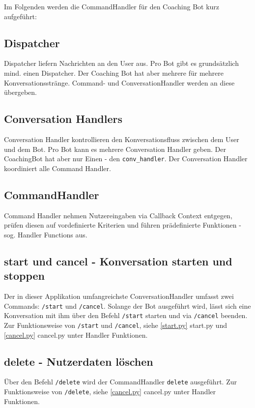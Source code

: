         Im Folgenden werden die CommandHandler für den Coaching Bot kurz aufgeführt:
        
        \subsection{Dispatcher}
            Dispatcher liefern Nachrichten an den User aus. Pro Bot gibt es grundsätzlich mind. einen Dispatcher. Der Coaching Bot hat aber mehrere für mehrere Konversationsstränge. Command- und ConversationHandler werden an diese übergeben.


        \subsection{Conversation Handlers}
            Conversation Handler kontrollieren den Konversationsfluss zwischen dem User und dem Bot. Pro Bot kann es mehrere Conversation Handler geben. Der CoachingBot hat aber nur Einen - den \verb|conv_handler|. Der Conversation Handler koordiniert alle Command Handler.


        \subsection{CommandHandler}
            Command Handler nehmen Nutzereingaben via Callback Context entgegen, prüfen diesen auf vordefinierte Kriterien und führen prädefinierte Funktionen - sog. Handler Functions aus.


        \subsection{start und cancel - Konversation starten und stoppen}
            Der in dieser Applikation umfangreichste ConversationHandler umfasst zwei Commands: \verb|/start| und \verb|/cancel|. Solange der Bot ausgeführt wird, lässt sich eine Konversation mit ihm über den Befehl \verb|/start| starten und via \verb|/cancel| beenden. Zur Funktionsweise von \verb|/start| und \verb|/cancel|, siehe \ref{start.py} start.py und \ref{cancel.py} cancel.py unter Handler Funktionen. 


        \subsection{delete - Nutzerdaten löschen}
            Über den Befehl \verb|/delete| wird der CommandHandler \verb|delete| ausgeführt. Zur Funktionsweise von \verb|/delete|, siehe \ref{cancel.py} cancel.py unter Handler Funktionen. 



